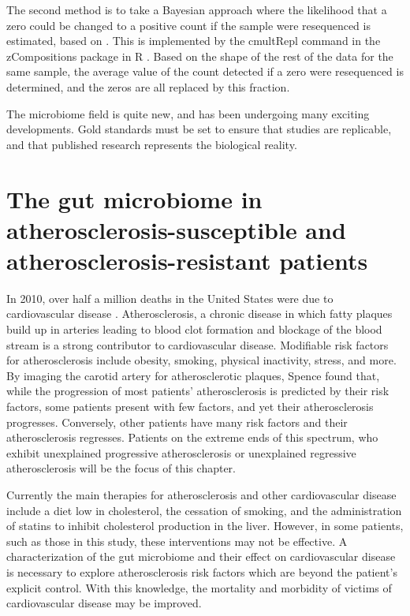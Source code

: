 The second method is to take a Bayesian approach where the likelihood that a zero could be changed to a positive count if the sample were resequenced is estimated, based on . This is implemented by the cmultRepl command in the zCompositions package in R \cite{palarea2015zcompositions}. Based on the shape of the rest of the data for the same sample, the average value of the count detected if a zero were resequenced is determined, and the zeros are all replaced by this fraction.

The microbiome field is quite new, and has been undergoing many exciting developments. Gold standards must be set to ensure that studies are replicable, and that published research represents the biological reality.

\section{The gut microbiome in atherosclerosis-susceptible and atherosclerosis-resistant patients}

In 2010, over half a million deaths in the United States were due to cardiovascular disease \cite{murphy2012deaths}. Atherosclerosis, a chronic disease in which fatty plaques build up in arteries leading to blood clot formation and blockage of the blood stream is a strong contributor to cardiovascular disease. Modifiable risk factors for atherosclerosis include obesity, smoking, physical inactivity, stress, and more. By imaging the carotid artery for atherosclerotic plaques, Spence \cite{spence2012genetics} found that, while the progression of most patients’ atherosclerosis is predicted by their risk factors, some patients present with few factors, and yet their atherosclerosis progresses. Conversely, other patients have many risk factors and their atherosclerosis regresses. Patients on the extreme ends of this spectrum, who exhibit unexplained progressive atherosclerosis or unexplained regressive atherosclerosis will be the focus of this chapter.

Currently the main therapies for atherosclerosis and other cardiovascular disease include a diet low in cholesterol, the cessation of smoking, and the administration of statins to inhibit cholesterol production in the liver. However, in some patients, such as those in this study, these interventions may not be effective. A characterization of the gut microbiome and their effect on cardiovascular disease is necessary to explore atherosclerosis risk factors which are beyond the patient’s explicit control. With this knowledge, the mortality and morbidity of victims of cardiovascular disease may be improved.

